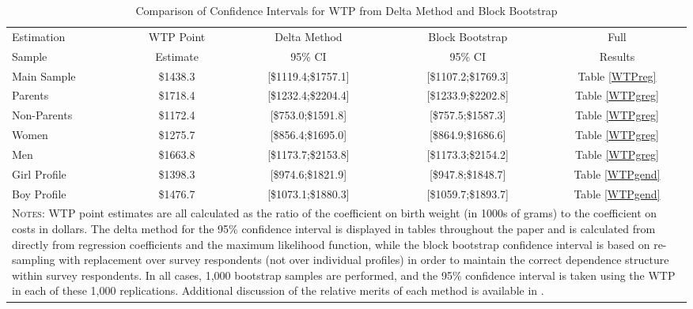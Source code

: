 \documentclass[a4paper, 11pt]{article}
\begin{document}
\begin{table}
  \caption{Comparison of Confidence Intervals for WTP from Delta Method and Block Bootstrap}
  \label{bootstrapCI}
  \begin{tabular}{lcccc} \toprule
    Estimation & WTP Point & Delta Method & Block Bootstrap & Full \\
    Sample     &  Estimate & 95\% CI      & 95\% CI         & Results \\ \midrule
    Main Sample&  \$1438.3 & [\$1119.4;\$1757.1] & [\$1107.2;\$1769.3] & Table \ref{WTPreg} \\
    Parents    &  \$1718.4 & [\$1232.4;\$2204.4] & [\$1233.9;\$2202.8] & Table \ref{WTPgreg} \\
    Non-Parents&  \$1172.4 & [\$753.0;\$1591.8]  & [\$757.5;\$1587.3]  & Table \ref{WTPgreg} \\
    Women      &  \$1275.7 & [\$856.4;\$1695.0]  & [\$864.9;\$1686.6]  & Table \ref{WTPgreg} \\
    Men        &  \$1663.8 & [\$1173.7;\$2153.8] & [\$1173.3;\$2154.2] & Table \ref{WTPgreg} \\
   Girl Profile&  \$1398.3 & [\$974.6;\$1821.9]  & [\$947.8;\$1848.7]  & Table \ref{WTPgend} \\
    Boy Profile&  \$1476.7 & [\$1073.1;\$1880.3] & [\$1059.7;\$1893.7] & Table \ref{WTPgend} \\
    \midrule
    \multicolumn{5}{p{13.6cm}}{{\footnotesize \textsc{Notes}: WTP point estimates
        are all calculated as the ratio of the coefficient on birth weight (in
        1000s of grams) to the coefficient on costs in dollars. The delta method
        for the 95\% confidence interval is displayed in tables throughout the
        paper and is calculated from directly from regression coefficients and
        the maximum likelihood function, while the block bootstrap confidence
        interval is based on re-sampling with replacement over survey respondents
        (not over individual profiles) in order to maintain the correct dependence
        structure within survey respondents.  In all cases, 1,000 bootstrap
        samples are performed, and the 95\% confidence interval is taken using the
        WTP in each of these 1,000 replications. Additional discussion of the
    relative merits of each method is available in \citet{Hole2007}.}}
  \end{tabular}
\end{table}

\clearpage
\end{document}
